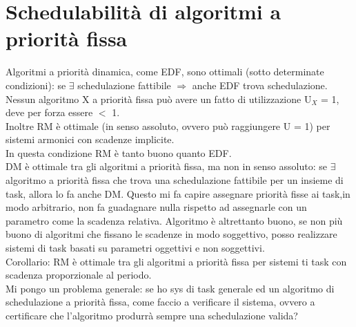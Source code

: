 \documentclass[12pt, oneside]{extbook}
\begin{document}
\section{Schedulabilità di algoritmi a priorità fissa}
Algoritmi a priorità dinamica, come EDF, sono ottimali (sotto determinate condizioni): se $\exists$ schedulazione fattibile $\Rightarrow$ anche EDF trova schedulazione.\\ Nessun algoritmo X a priorità fissa può avere un fatto di utilizzazione U$_{X}$ = 1, deve per forza essere $<$ 1.\\ Inoltre RM è ottimale (in senso assoluto, ovvero può raggiungere U = 1) per sistemi armonici con scadenze implicite.\\ In questa condizione RM è tanto buono quanto EDF.\\ DM è ottimale tra gli algoritmi a priorità fissa, ma non in senso assoluto: se $\exists$ algoritmo a priorità fissa che trova una schedulazione fattibile per un insieme di task, allora lo fa anche DM. Questo mi fa capire assegnare priorità fisse ai task,in modo arbitrario, non fa guadagnare nulla rispetto ad assegnarle con un parametro come la scadenza relativa. Algoritmo è altrettanto buono, se non più buono di algoritmi che fissano le scadenze in modo soggettivo, posso realizzare sistemi di task basati su parametri oggettivi e non soggettivi.\\ Corollario: RM è ottimale tra gli algoritmi a priorità fissa per sistemi ti task con scadenza proporzionale al periodo.\\ Mi pongo un problema generale: se ho sys di task generale ed un algoritmo di schedulazione a priorità fissa, come faccio a verificare il sistema, ovvero a certificare che l'algoritmo produrrà sempre una schedulazione valida?
\end{document}
